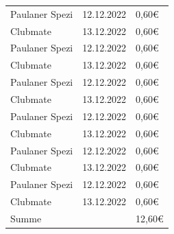 \documentclass{article}
\begin{document}
\begin{center}
\begin{longtable}{>{\raggedright}p{8cm}>{\raggedright}p{3cm}>{\raggedright}p{2.5cm}}
\rowcolor[gray]{.9} Paulaner Spezi    & 12.12.2022     & 0,60€\tabularnewline
Clubmate    & 13.12.2022     & 0,60€\tabularnewline
\rowcolor[gray]{.9} Paulaner Spezi    & 12.12.2022     & 0,60€\tabularnewline
Clubmate    & 13.12.2022     & 0,60€\tabularnewline
\rowcolor[gray]{.9} Paulaner Spezi    & 12.12.2022     & 0,60€\tabularnewline
Clubmate    & 13.12.2022     & 0,60€\tabularnewline
\rowcolor[gray]{.9} Paulaner Spezi    & 12.12.2022     & 0,60€\tabularnewline
Clubmate    & 13.12.2022     & 0,60€\tabularnewline
\rowcolor[gray]{.9} Paulaner Spezi    & 12.12.2022     & 0,60€\tabularnewline
Clubmate    & 13.12.2022     & 0,60€\tabularnewline
\rowcolor[gray]{.9} Paulaner Spezi    & 12.12.2022     & 0,60€\tabularnewline
Clubmate    & 13.12.2022     & 0,60€\tabularnewline\midrule
Summe & & 12,60€\tabularnewline
\bottomrule
\end{longtable}

\end{center}
\end{document}
